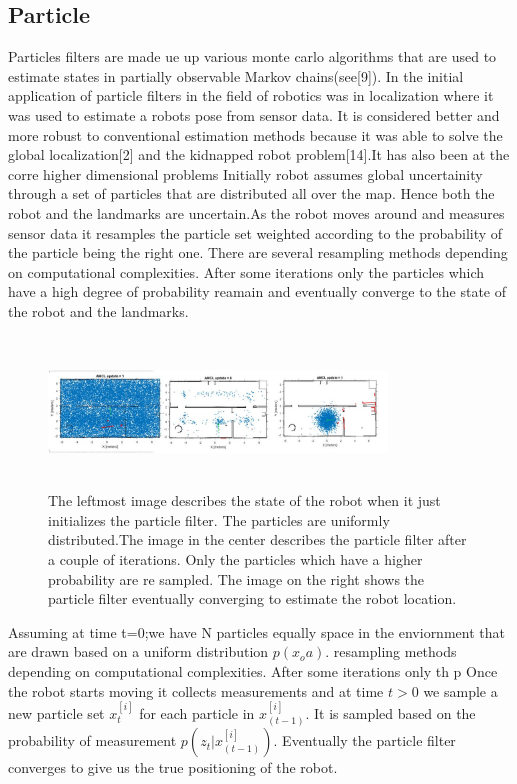 \documentclass[conference]{IEEEtran}
\begin{document}
\subsection{Particle}      %
Particles filters are made ue up various monte carlo algorithms that are used to estimate states in partially observable Markov chains(see[9]). In the initial application of particle filters in the field of robotics was in localization where it was used to estimate a robots pose from sensor data. It is considered better and more robust to conventional estimation methods because it was able to solve the global localization[2] and the kidnapped robot problem[14].It has also been at the corre higher dimensional problems  
Initially robot assumes global uncertainity through a set of particles that are distributed all over the map. Hence both the robot and the landmarks are uncertain.As the robot moves around and measures sensor data it resamples the particle set weighted according to the probability of the particle being the right one. There are several resampling methods depending on computational complexities. After some iterations only the particles which have a high degree of probability  reamain and eventually converge to the state of the robot and the landmarks.
\begin{figure}[h!]
	\centering
	\includegraphics[height=40mm,width=90mm]{Particle_filter_method.JPG}
	\caption{The leftmost image describes the state of the robot when it just initializes the particle filter. The particles are uniformly distributed.The image in the center describes the particle filter after a couple of iterations. Only the particles which have a higher probability are re sampled. The image on the right shows the particle filter eventually converging to estimate the robot location. }
	
\end{figure}
Assuming at time t=0;we have N particles equally space in the enviornment that are drawn based on a uniform distribution $ p(x_oa)$.                                                                        resampling methods depending on computational complexities. After some iterations only th   p
Once the robot starts moving it collects measurements and at time $t>0$ we sample a new particle set $x^{[i]}_t$ for each particle in $x^{[i]}_{(t-1)}$. It is sampled based on the probability of measurement $p(z_t|x^{[i]}_{(t-1)})$. Eventually the particle filter converges to give us the true positioning of the robot.
\end{document}
